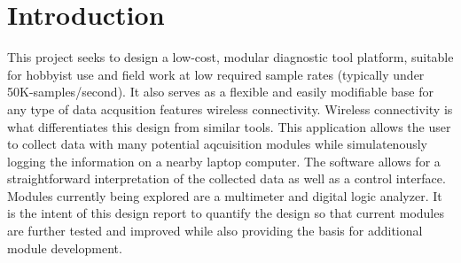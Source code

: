 \section[Introduction]{Introduction}
This project seeks to design a low-cost, modular diagnostic tool platform, 
suitable for hobbyist use and field work at low required sample rates 
(typically under 50K-samples/second). It also serves as a flexible and easily 
modifiable base for any type of data acqusition features wireless connectivity. 
 Wireless connectivity is what differentiates this design from similar tools. This application allows the user to collect
data with many potential aqcuisition modules while simulatenously logging the
information on a nearby laptop computer. The software allows for a
straightforward interpretation of the collected data as well as a control interface.
Modules currently being explored are a multimeter and digital logic analyzer. 
It is the intent of this design report to quantify the design so that current
modules are further tested and improved while also providing the basis for
additional module development.

